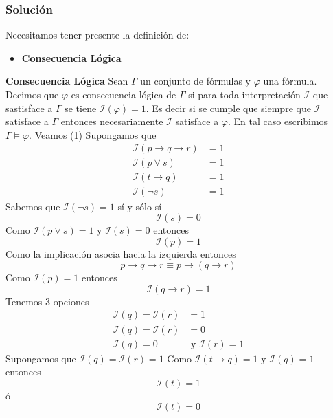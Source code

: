 \documentclass[a4paper]{article}
\begin{document}
\subsubsection*{Solución}
Necesitamos tener presente la definición de:
\begin{itemize}
    \item \textbf{Consecuencia Lógica}
\end{itemize}
\textbf{Consecuencia Lógica}
\newline
Sean $\Gamma$ un conjunto de f\'ormulas y $\varphi$ una f\'ormula. Decimos 
que $\varphi$ es consecuencia l\'ogica de $\Gamma$ si para toda interpretaci\'on 
$\mathcal{I}$ que sastisface a $\Gamma$ se tiene $\mathcal{I}(\varphi)=1$. 
Es decir si se cumple que siempre que $\mathcal{I}$ satisface a $\Gamma$ entonces 
necesariamente $\mathcal{I}$ satisface a $\varphi$.
En tal caso escribimos $\Gamma\models\varphi$.
\newline 
Veamos (1)
\newline
Supongamos que
\begin{align*}
    \mathcal{I}\left(p \to q \to r\right) &= 1 \\
    \mathcal{I}\left(p\lor s\right) &= 1 \\
    \mathcal{I}\left(t \to q\right) &= 1 \\
    \mathcal{I}\left(\lnot s\right) &= 1
\end{align*}
Sabemos que \(\mathcal{I}\left(\lnot s\right) = 1\) sí y sólo sí
\[
    \mathcal{I}\left(s\right) = 0
\]
Como \(\mathcal{I}\left(p\lor s\right) = 1\) y \(\mathcal{I}\left(s\right) = 0\) entonces
\[
    \mathcal{I}\left(p\right) = 1
\]
Como la implicación asocia hacia la izquierda entonces
\[
    p \to q \to r \equiv p \to \left(q \to r\right)
\]
Como \(\mathcal{I}\left(p\right) = 1\) entonces
\[
    \mathcal{I}\left(q \to r\right) = 1
\]
Tenemos 3 opciones
\begin{align*}
    \mathcal{I}\left(q\right) = \mathcal{I}\left(r\right) &= 1 \\
    \mathcal{I}\left(q\right) = \mathcal{I}\left(r\right) &= 0 \\
    \mathcal{I}\left(q\right) = 0 &\text{ y } \mathcal{I}\left(r\right) = 1 
\end{align*}
Supongamos que \(\mathcal{I}\left(q\right) = \mathcal{I}\left(r\right) = 1\)
\newline 
Como \(\mathcal{I}\left(t \to q\right) = 1\) y \(\mathcal{I}\left(q\right) = 1\) entonces
\[
    \mathcal{I}\left(t\right) = 1
\]
ó
\[
    \mathcal{I}\left(t\right) = 0
\]
\end{document}
